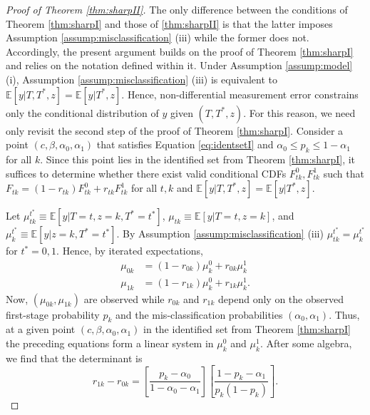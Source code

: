 
\begin{proof}[Proof of Theorem \ref{thm:sharpII}]
The only difference between the conditions of Theorem \ref{thm:sharpI} and those of \ref{thm:sharpII} is that the latter imposes Assumption \ref{assump:misclassification} (iii) while the former does not.
Accordingly, the present argument builds on the proof of Theorem \ref{thm:sharpI} and relies on the notation defined within it.
Under Assumption \ref{assump:model} (i), Assumption \ref{assump:misclassification} (iii) is equivalent to $\mathbb{E}[y|T,T^*,z] = \mathbb{E}[y|T^*,z]$.
Hence, non-differential measurement error constrains only the conditional distribution of $y$ given $(T,T^*,z)$.
For this reason, we need only revisit the second step of the proof of Theorem \ref{thm:sharpI}.
Consider a point $(c, \beta, \alpha_0, \alpha_1)$ that satisfies Equation \ref{eq:identsetI} and $\alpha_0 \leq p_k \leq 1 - \alpha_1$ for all $k$.
Since this point lies in the identified set from Theorem \ref{thm:sharpI}, it suffices to determine whether there exist valid conditional CDFs $F_{tk}^{0}, F_{tk}^{1}$ such that $F_{tk} = (1 - r_{tk}) F_{tk}^0 + r_{tk} F_{tk}^1$ for all $t,k$ and $\mathbb{E}[y|T,T^*,z] = \mathbb{E}[y|T^*,z]$.

Let $\mu_{tk}^{t^*} \equiv \mathbb{E}[y|T=t,z=k,T^*=t^*]$, $\mu_{tk} \equiv \mathbb{E}[y|T=t,z=k]$, and $\mu_{k}^{t^*} \equiv \mathbb{E}[y|z=k,T^*=t^*]$.
By Assumption \ref{assump:misclassification} (iii) $\mu_{tk}^{t^*} = \mu_{k}^{t^*}$ for $t^* =0,1$.
Hence, by iterated expectations,
\begin{align*}
  \mu_{0k} &= (1 - r_{0k}) \mu_{k}^0 + r_{0k} \mu_{k}^1\\ 
  \mu_{1k} &= (1 - r_{1k}) \mu_{k}^0 + r_{1k} \mu_{k}^1.
\end{align*}
Now, $(\mu_{0k},\mu_{1k})$ are observed while $r_{0k}$ and $r_{1k}$ depend only on the observed first-stage probability $p_k$ and the mis-classification probabilities $(\alpha_0,\alpha_1)$. Thus, at a given point $(c, \beta, \alpha_0, \alpha_1)$ in the identified set from Theorem \ref{thm:sharpI} the preceding equations form a linear system in $\mu_{k}^0$ and $\mu_{k}^1$.
After some algebra, we find that the determinant is
\[
  r_{1k} - r_{0k} = \left[ \frac{p_k - \alpha_0}{1 - \alpha_0 - \alpha_1} \right]\left[ \frac{1 - p_k - \alpha_1}{p_k(1 - p_k)} \right].
\]


\end{proof}
